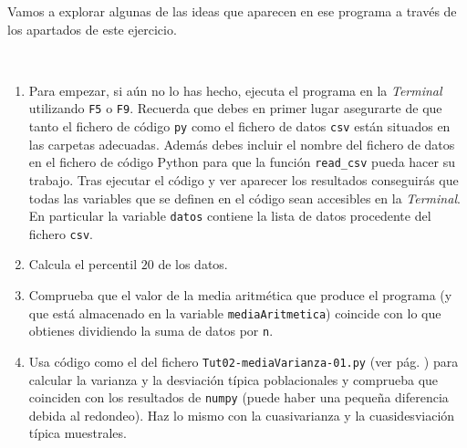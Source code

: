\documentclass[10pt,a4paper]{article}\usepackage[]{graphicx}\usepackage[]{color}
\newcounter {cont01}
\begin{document}
Vamos a explorar algunas de las ideas que aparecen en ese programa a través de los apartados de este ejercicio.
\begin{ejercicio}
\label{tut02:ejercicio26}
\quad\\
\begin{enumerate}

\item Para empezar, si aún no lo has hecho, ejecuta el programa en la {\em Terminal} utilizando {\tt F5} o {\tt F9}.
Recuerda que debes en primer lugar asegurarte de que tanto el fichero de código {\tt py} como el fichero de datos {\tt csv} están situados en las carpetas adecuadas. Además debes incluir el nombre del fichero de datos en el fichero de código Python para que la función \verb&read_csv& pueda hacer su trabajo.  Tras ejecutar el código y ver aparecer los resultados conseguirás que todas las variables que se definen en el código sean accesibles en la {\em Terminal}. En particular la variable {\tt datos} contiene la lista de datos procedente del fichero {\tt csv}.

\item Calcula el percentil $20$ de los datos.

\item Comprueba que el valor de la media aritmética que produce el programa (y que está almacenado en la variable {\tt mediaAritmetica}) coincide con lo que obtienes dividiendo la suma de datos por {\tt n}.

\item Usa código como el del fichero {\tt Tut02-mediaVarianza-01.py} (ver pág. \pageref{fichero:Tut02-mediaVarianza-01}) para calcular la varianza y la desviación típica poblacionales y comprueba que coinciden con los resultados de {\tt numpy} (puede haber una pequeña diferencia debida al redondeo). Haz lo mismo con la cuasivarianza y la cuasidesviación típica muestrales.


\end{enumerate}
\end{ejercicio}
\end{document}
